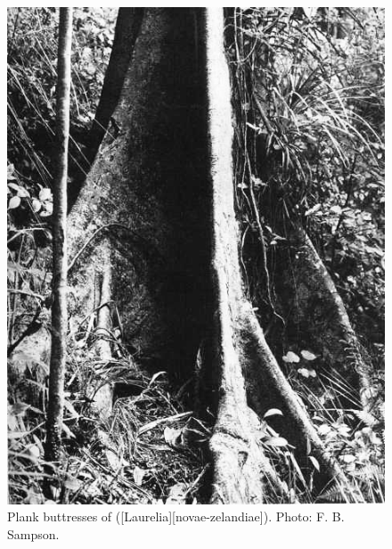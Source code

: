 \begin{figure}[t]
	\begin{minipage}[t]{\textwidth}
		\begin{minipage}[t]{(\textwidth-\fgap-\fgap) * \real{0.342}}
			\centering
			\includegraphics[width=\textwidth]{graphics/figure9buttresses.jpg}
			\caption[Plank buttresses of pukatea]{Plank buttresses of  ([Laurelia][novae-zelandiae]).
			Photo:  F. B. Sampson.}%
			\label{fig:9buttresses}
		\end{minipage}\hspace{\fgap}%
		\begin{minipage}[t]{(\textwidth-\fgap-\fgap) * \real{0.362}}
			\centering

\end{minipage}
\end{minipage}
\end{figure}
